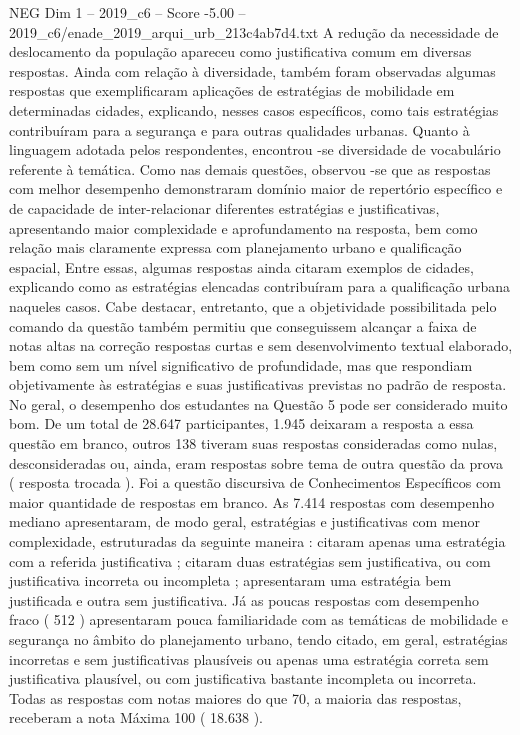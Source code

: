 \begin{textsample}{NEG Dim 1 – 2019\_c6 – Score -5.00 – 2019\_c6/enade\_2019\_arqui\_urb\_213c4ab7d4.txt}
A redução da necessidade de deslocamento da população apareceu como justificativa comum em diversas respostas.
Ainda com relação à diversidade, também foram observadas algumas respostas que exemplificaram aplicações de estratégias de mobilidade em determinadas cidades, explicando, nesses casos específicos, como tais estratégias contribuíram para a segurança e para outras qualidades urbanas.
Quanto à linguagem adotada pelos respondentes, encontrou -se diversidade de vocabulário referente à temática.
Como nas demais questões, observou -se que as respostas com melhor desempenho demonstraram domínio maior de repertório específico e de capacidade de inter-relacionar diferentes estratégias e justificativas, apresentando maior complexidade e aprofundamento na resposta, bem como relação mais claramente expressa com planejamento urbano e qualificação espacial, Entre essas, algumas respostas ainda citaram exemplos de cidades, explicando como as estratégias elencadas contribuíram para a qualificação urbana naqueles casos.
Cabe destacar, entretanto, que a objetividade possibilitada pelo comando da questão também permitiu que conseguissem alcançar a faixa de notas altas na correção respostas curtas e sem desenvolvimento textual elaborado, bem como sem um nível significativo de profundidade, mas que respondiam objetivamente às estratégias e suas justificativas previstas no padrão de resposta.
No geral, o desempenho dos estudantes na Questão 5 pode ser considerado muito bom.
De um total de 28.647 participantes, 1.945 deixaram a resposta a essa questão em branco, outros 138 tiveram suas respostas consideradas como nulas, desconsideradas ou, ainda, eram respostas sobre tema de outra questão da prova ( resposta trocada ).
Foi a questão discursiva de Conhecimentos Específicos com maior quantidade de respostas em branco.
As 7.414 respostas com desempenho mediano apresentaram, de modo geral, estratégias e justificativas com menor complexidade, estruturadas da seguinte maneira : citaram apenas uma estratégia com a referida justificativa ; citaram duas estratégias sem justificativa, ou com justificativa incorreta ou incompleta ; apresentaram uma estratégia bem justificada e outra sem justificativa.
Já as poucas respostas com desempenho fraco ( 512 ) apresentaram pouca familiaridade com as temáticas de mobilidade e segurança no âmbito do planejamento urbano, tendo citado, em geral, estratégias incorretas e sem justificativas plausíveis ou apenas uma estratégia correta sem justificativa plausível, ou com justificativa bastante incompleta ou incorreta.
Todas as respostas com notas maiores do que 70, a maioria das respostas, receberam a nota Máxima 100 ( 18.638 ).

\end{textsample}
